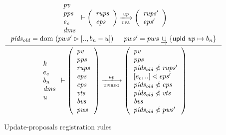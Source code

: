 \begin{figure}[htb]
  \begin{equation}
    \label{eq:rule:upi-reg-interface}
    \inference
    {
      {
        \begin{array}{l}
          \var{pv}\\
          \var{pps}\\
          \var{e_c}\\
          \var{dms}
        \end{array}
      }
      \vdash
      {
        \left(
          \begin{array}{l}
            \var{rups}\\
            \var{eps}
          \end{array}
        \right)
      }
      \trans{upa}{\var{up}}
      {
        \left(
          \begin{array}{l}
            \var{rups'}\\
            \var{eps'}
          \end{array}
        \right)
      }
      \\
      \var{pids_{old}} = \dom~(pws' \restrictrange [.., b_n - u]) &
      pws' = pws \unionoverride \{ \upId{up} \mapsto b_n\}
    }
    {
      {
        \begin{array}{l}
          k\\
          e_c\\
          b_n\\
          \var{dms}\\
          u
        \end{array}
      }
      \vdash
      {
        \left(
          \begin{array}{l}
            \var{pv}\\
            \var{pps}\\
            \var{rups}\\
            \var{eps}\\
            \var{cps}\\
            \var{vts}\\
            \var{bvs}\\
            \var{pws}
          \end{array}
        \right)
      }
      \trans{upireg}{\var{up}}
      {
        \left(
          \begin{array}{l}
            \var{pv}\\
            \var{pps}\\
            \var{pids_{old}} \subtractdom \var{rups'}\\
            {[e_c, ..]} \restrictdom \var{eps'}\\
            \var{pids_{old}} \subtractdom \var{cps}\\
            \var{pids_{old}} \subtractdom \var{vts}\\
            \var{bvs}\\
            \var{pids_{old}} \subtractdom \var{pws'}
          \end{array}
        \right)
      }
    }
  \end{equation}
  \caption{Update-proposals registration rules}
  \label{fig:rules:upi-reg-interface}
\end{figure}

